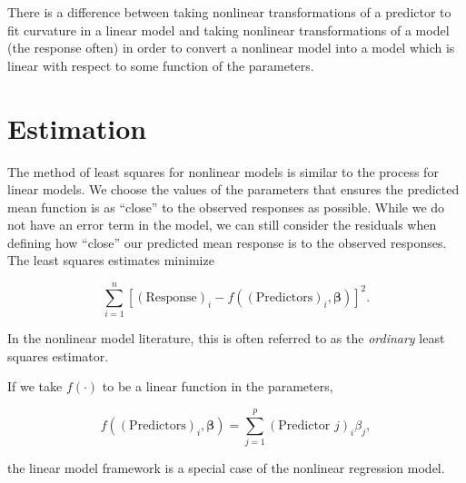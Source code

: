 \documentclass[
  letterpaper,
  DIV=11,
  numbers=noendperiod]{scrreprt}
\theoremstyle{definition}
\theoremstyle{definition}
\theoremstyle{remark}
\begin{document}
\begin{tcolorbox}[enhanced jigsaw, left=2mm, toprule=.15mm, arc=.35mm, breakable, opacitybacktitle=0.6, opacityback=0, rightrule=.15mm, colbacktitle=quarto-callout-warning-color!10!white, coltitle=black, leftrule=.75mm, toptitle=1mm, colframe=quarto-callout-warning-color-frame, titlerule=0mm, title=\textcolor{quarto-callout-warning-color}{\faExclamationTriangle}\hspace{0.5em}{Warning}, bottomrule=.15mm, colback=white, bottomtitle=1mm]

There is a difference between taking nonlinear transformations of a
predictor to fit curvature in a linear model and taking nonlinear
transformations of a model (the response often) in order to convert a
nonlinear model into a model which is linear with respect to some
function of the parameters.

\end{tcolorbox}

\hypertarget{estimation}{%
\section{Estimation}\label{estimation}}

The method of least squares for nonlinear models is similar to the
process for linear models. We choose the values of the parameters that
ensures the predicted mean function is as ``close'' to the observed
responses as possible. While we do not have an error term in the model,
we can still consider the residuals when defining how ``close'' our
predicted mean response is to the observed responses. The least squares
estimates minimize

\[\sum\limits_{i=1}^{n} \left[(\text{Response})_i - f\left((\text{Predictors})_i, \boldsymbol{\beta}\right)\right]^2.\]

In the nonlinear model literature, this is often referred to as the
\emph{ordinary} least squares estimator.

\begin{tcolorbox}[enhanced jigsaw, left=2mm, toprule=.15mm, arc=.35mm, breakable, opacitybacktitle=0.6, opacityback=0, rightrule=.15mm, colbacktitle=quarto-callout-note-color!10!white, coltitle=black, leftrule=.75mm, toptitle=1mm, colframe=quarto-callout-note-color-frame, titlerule=0mm, title=\textcolor{quarto-callout-note-color}{\faInfo}\hspace{0.5em}{Note}, bottomrule=.15mm, colback=white, bottomtitle=1mm]

If we take \(f(\cdot)\) to be a linear function in the parameters,

\[f\left((\text{Predictors})_i, \boldsymbol{\beta}\right) = \sum_{j=1}^{p} (\text{Predictor } j)_i \beta_j,\]

the linear model framework is a special case of the nonlinear regression
model.

\end{tcolorbox}
\end{document}
